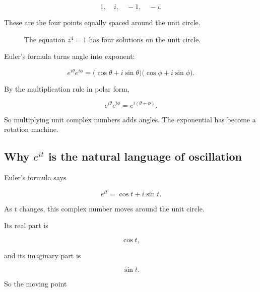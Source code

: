 \[
1,\quad i,\quad -1,\quad -i.
\]

These are the four points equally spaced around the unit circle.

\begin{figure}[h]
\centering
{}
\caption{The equation \(z^4=1\) has four solutions on the unit circle.}
\label{fig:fourth-roots-unity}
\end{figure}

Euler's formula turns angle into exponent:

\[
e^{i\theta}e^{i\phi}
=
\bigl(\cos\theta+i\sin\theta\bigr)
\bigl(\cos\phi+i\sin\phi\bigr).
\]

By the multiplication rule in polar form,

\[
e^{i\theta}e^{i\phi}=e^{i(\theta+\phi)}.
\]

So multiplying unit complex numbers adds angles.  The exponential has become a
rotation machine.

\subsection{\texorpdfstring{Why \(e^{it}\) is the natural language of oscillation}{Why e^{it} is the natural language of oscillation}}
\label{subsec:eit-natural-language-oscillation}

Euler's formula says

\[
e^{it}=\cos t+i\sin t.
\]

As \(t\) changes, this complex number moves around the unit circle.

Its real part is

\[
\cos t,
\]

and its imaginary part is

\[
\sin t.
\]

So the moving point

